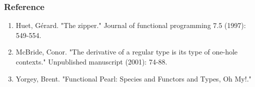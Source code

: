 \begin{frame}
\frametitle{Reference}

\begin{enumerate}
\item {Huet, Gérard. "The zipper." Journal of functional programming 7.5 (1997): 549-554.}
\item {McBride, Conor. "The derivative of a regular type is its type of one-hole contexts." Unpublished manuscript (2001): 74-88.}
\item {Yorgey, Brent. "Functional Pearl: Species and Functors and Types, Oh My!."}
\end{enumerate}
\end{frame}